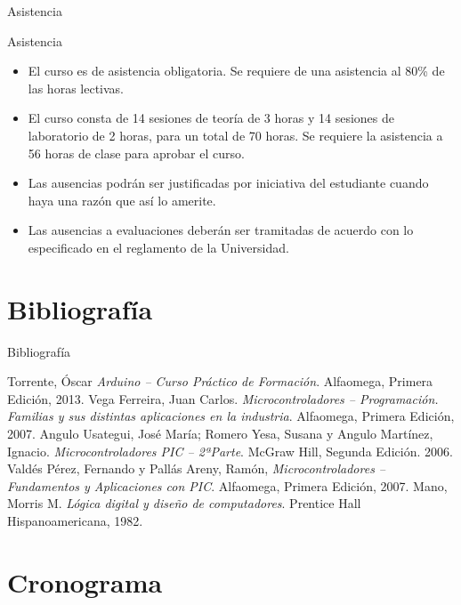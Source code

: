 \documentclass[xcolor=dvipsnames]{beamer}
\newcommand{\pageframe}[1]{\frame{\begin{center}{ \Huge #1 }\end{center}}}
\begin{document}
\begin{frame}{Asistencia}
\begin{block}{Asistencia}
  \begin{itemize}[<+->]
    \item El curso es de asistencia obligatoria. Se requiere de una asistencia al 80\% de las horas lectivas.
    \item El curso consta de 14 sesiones de teoría de 3 horas y 14 sesiones de laboratorio de 2 horas, para un total de 70 horas. Se requiere la asistencia a 56 horas de clase para aprobar el curso.
    \item Las ausencias podrán ser justificadas por iniciativa del estudiante cuando haya una razón que así lo amerite.
    \item Las ausencias a evaluaciones deberán ser tramitadas de acuerdo con lo especificado en el reglamento de la Universidad.
  \end{itemize}
\end{block}
\end{frame}

\section{Bibliografía}

\pageframe{Bibliografía}
\nocite{*}

\begin{frame}{Bibliografía}

\begin{thebibliography}{5}
  Torrente, Óscar
  \textit{Arduino -- Curso Práctico de Formación}.
  Alfaomega,
  Primera Edición,
  2013.
  Vega Ferreira, Juan Carlos.
  \textit{Microcontroladores -- Programación. Familias y sus distintas aplicaciones en la industria}.
  Alfaomega,
  Primera Edición,
  2007.
  Angulo Usategui, José María; Romero Yesa, Susana y Angulo Martínez, Ignacio.
  \textit{Microcontroladores PIC -- 2ªParte}.
  McGraw Hill,
  Segunda Edición.
  2006.
  Valdés Pérez, Fernando y Pallás Areny, Ramón,
  \textit{Microcontroladores -- Fundamentos y Aplicaciones con PIC}.
  Alfaomega,
  Primera Edición,
  2007.
  Mano, Morris M.
  \textit{Lógica digital y diseño de computadores}.
  Prentice Hall Hispanoamericana,
  1982.
\end{thebibliography}

\end{frame}

\section{Cronograma}
\end{document}

